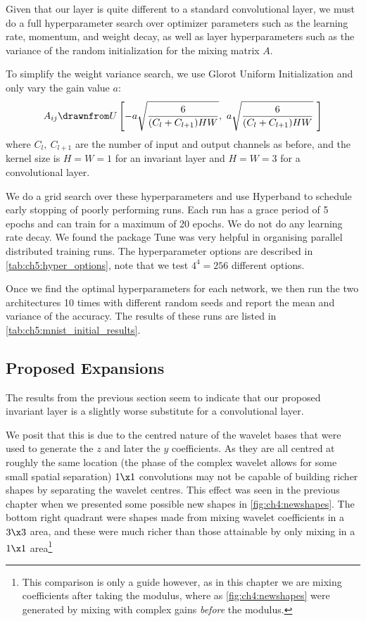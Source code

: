 Given that our layer is quite different to a standard convolutional layer, we
must do a full hyperparameter search over optimizer parameters such as the
learning rate, momentum, and weight decay, as well as layer hyperparameters 
such as the variance of the random initialization for the mixing matrix $A$.

To simplify the weight variance search, we use Glorot Uniform Initialization
\cite{glorot_understanding_2010} and only vary the gain value $a$:
%
\begin{equation}
  A_{ij} \drawnfrom U\left[ -a\sqrt{\frac{6}{(C_l + C_{l+1})HW}},\ a\sqrt{\frac{6}{(C_l + C_{l+1})HW}}\
  \right] \label{eq:ch5:glorot}
\end{equation}
%
where $C_l,\ C_{l+1}$ are the number of input and output channels as before, and
the kernel size is $H = W = 1$ for an invariant layer and $H = W= 3$ for a
convolutional layer.

We do a grid search over these hyperparameters and use Hyperband
\cite{li_hyperband:_2016} to schedule early stopping of poorly performing runs.
Each run has a grace period of 5 epochs and can train for a maximum of 20
epochs. We do not do any learning rate decay.  We found the package Tune
\cite{liaw2018tune} was very helpful in organising parallel distributed training
runs.  
The hyperparameter options are described in
\autoref{tab:ch5:hyper_options}, note that we test $4^4=256$ different options.

Once we find the optimal hyperparameters for each network, we then run the two
architectures 10 times with different random seeds and report the mean and variance of
the accuracy. The results of these runs are listed in
\autoref{tab:ch5:mnist_initial_results}.


\subsection{Proposed Expansions}\label{sec:ch5:mnist_newlayer}
The results from the previous section seem to indicate that our proposed
invariant layer is a slightly worse substitute for a convolutional layer.

We posit that this is due to the centred nature of the wavelet bases that were
used to generate the $z$ and later the $y$ coefficients. As they are all centred
at roughly the same location (the phase of the complex wavelet allows for some
small spatial separation) $1\x 1$ convolutions may not be capable of building
richer shapes by separating the wavelet centres. This effect was seen in the
previous chapter when we presented some possible new shapes in
\autoref{fig:ch4:newshapes}. The bottom right quadrant were shapes made from
mixing wavelet coefficients in a $3\x 3$ area, and these were much richer than
those attainable by only mixing in a $1\x 1$ area\footnote{This comparison is
only a guide however, as in this chapter we are mixing coefficients after taking
the modulus, where as \autoref{fig:ch4:newshapes} were generated by mixing with
complex gains \emph{before} the modulus.}

